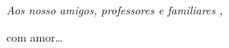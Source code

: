 \null
\vfill

{\normalsize \it \hfill Aos nosso amigos, professores e familiares , \vspace*{4pt}

\hfill com amor\dots}
